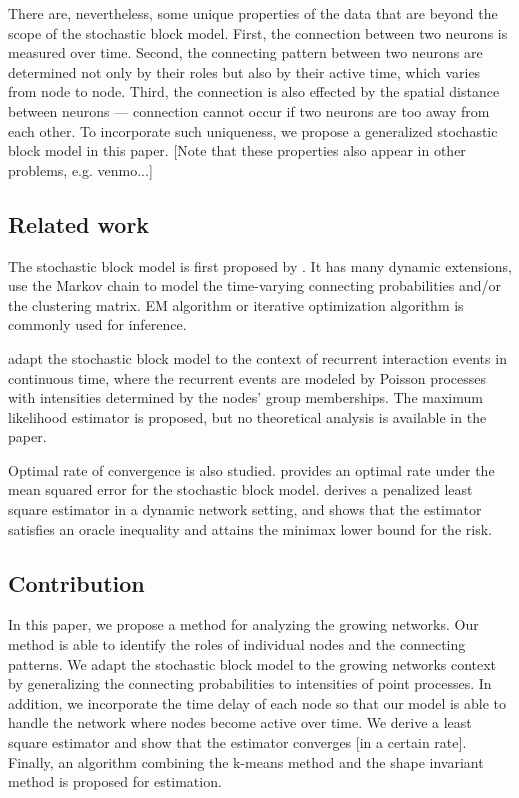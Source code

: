 There are, nevertheless, some unique properties of the data that are beyond the scope of the stochastic block model.
First, the connection between two neurons is measured over time.
Second, the connecting pattern between two neurons are determined not only by their roles but also by their active time, which varies from node to node.
Third, the connection is also effected by the spatial distance between neurons --- connection cannot occur if two neurons are too away from each other.
To incorporate such uniqueness, we propose a generalized stochastic block model in this paper.
[Note that these properties also appear in other problems, e.g. venmo...]


\subsection*{Related work}
	The stochastic block model is first proposed by \citet{Holland1983}.
	It has many dynamic extensions,
	\citet{Yang2011,Xu2014a,Matias2016,Xu2015} use the Markov chain to model the time-varying  connecting probabilities and/or the clustering matrix. 
	EM algorithm or iterative optimization algorithm is commonly used for inference.

	 \citet{Matias2018} adapt the stochastic block model to the context of recurrent interaction events in continuous time, 
	where the recurrent events are modeled by Poisson processes with intensities determined by the nodes' group memberships. 
	The maximum likelihood estimator is proposed, but no theoretical analysis is available in the paper. 

	Optimal rate of convergence is also studied.
	\citet{Gao2015a} provides an optimal rate under the mean squared error for the stochastic block model.
	\citet{Pensky2019a} 
	derives a penalized least square estimator in a dynamic network setting, and shows that the estimator satisfies an oracle inequality and  attains the minimax lower bound for the risk.





\subsection*{Contribution}
	In this paper, we propose a method for analyzing the growing networks. Our method is able to identify the roles of individual nodes and the connecting patterns.
	We adapt the stochastic block model to the growing networks context by generalizing the connecting probabilities to intensities of point processes. 
	In addition, we incorporate the time delay of each node so that our model is able to handle the network where nodes become active over time.
	We derive a least square estimator and show that the estimator converges [in a certain rate].
	Finally, an algorithm combining the k-means method and the shape invariant method is proposed for estimation.



